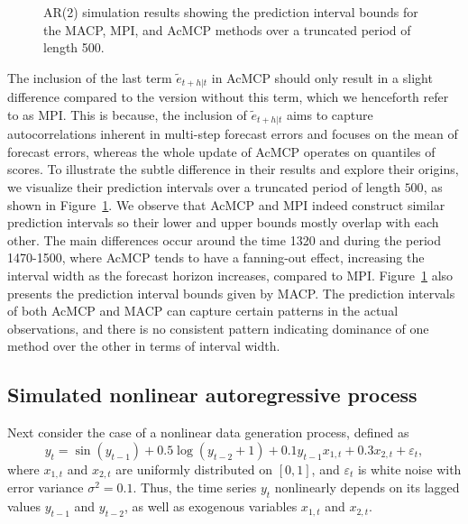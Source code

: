 \documentclass[
  11pt,
  12pt]{article}
\theoremstyle{plain}
\theoremstyle{remark}
\begin{document}
\begin{figure}[!b]


\caption{\label{fig-AR2_timeplot}AR(2) simulation results showing the
prediction interval bounds for the MACP, MPI, and AcMCP methods over a
truncated period of length 500.}

\end{figure}%

The inclusion of the last term \(\tilde{e}_{t+h|t}\) in AcMCP should
only result in a slight difference compared to the version without this
term, which we henceforth refer to as MPI. This is because, the
inclusion of \(\tilde{e}_{t+h|t}\) aims to capture autocorrelations
inherent in multi-step forecast errors and focuses on the mean of
forecast errors, whereas the whole update of AcMCP operates on quantiles
of scores. To illustrate the subtle difference in their results and
explore their origins, we visualize their prediction intervals over a
truncated period of length \(500\), as shown in
Figure~\ref{fig-AR2_timeplot}. We observe that AcMCP and MPI indeed
construct similar prediction intervals so their lower and upper bounds
mostly overlap with each other. The main differences occur around the
time 1320 and during the period 1470-1500, where AcMCP tends to have a
fanning-out effect, increasing the interval width as the forecast
horizon increases, compared to MPI. Figure~\ref{fig-AR2_timeplot} also
presents the prediction interval bounds given by MACP. The prediction
intervals of both AcMCP and MACP can capture certain patterns in the
actual observations, and there is no consistent pattern indicating
dominance of one method over the other in terms of interval width.

\subsection{Simulated nonlinear autoregressive
process}\label{simulated-nonlinear-autoregressive-process}

Next consider the case of a nonlinear data generation process, defined
as \[
y_t = \sin(y_{t-1}) + 0.5\log(y_{t-2} + 1) + 0.1y_{t-1}x_{1,t} + 0.3x_{2,t} + \varepsilon_{t},
\] where \(x_{1,t}\) and \(x_{2,t}\) are uniformly distributed on
\([0,1]\), and \(\varepsilon_{t}\) is white noise with error variance
\(\sigma^2 = 0.1\). Thus, the time series \(y_t\) nonlinearly depends on
its lagged values \(y_{t-1}\) and \(y_{t-2}\), as well as exogenous
variables \(x_{1,t}\) and \(x_{2,t}\).
\end{document}
